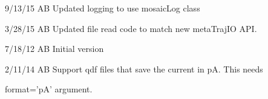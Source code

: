 \documentclass[letterpaper,10pt,english]{sphinxmanual}
\begin{document}
\begin{DUlineblock}{0em}
\item[] 9/13/15         AB      Updated logging to use mosaicLog class
\item[] 3/28/15         AB      Updated file read code to match new metaTrajIO API.
\item[] 7/18/12         AB      Initial version
\item[] 2/11/14         AB      Support qdf files that save the current in pA. This needs
\item[]
\begin{DUlineblock}{\DUlineblockindent}
\item[] format='pA' argument.
\end{DUlineblock}
\end{DUlineblock}
\end{document}
